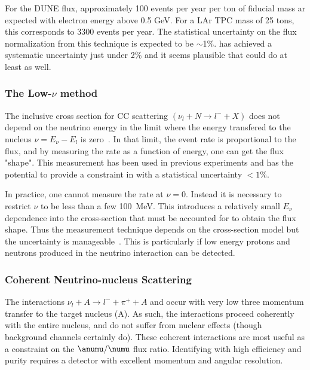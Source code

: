 For the DUNE flux, approximately 100 events per year per ton of fiducial mass ar expected with electron energy above 0.5 GeV. For a LAr TPC mass of 25 tons, this corresponds to 3300 events per year. The statistical uncertainty on the flux normalization from this technique is expected to be $\sim$1\%. \minerva has achieved a systematic uncertainty just under 2\% and it seems plausible that \dune could do at least as well\cite{bib:minervanue}. 


\subsubsection{The Low-$\nu$ method}
The inclusive cross section for CC scattering $(\nu_l+N\rightarrow l^-+X)$ does not depend on the neutrino energy in the limit where the energy transfered to the nucleus $\nu = E_\nu-E_{l} $ is zero~\cite{bib:original_lownu}.  In that limit, the event rate is proportional to the flux, and by measuring the rate as a function of energy, one can get the flux "shape". This measurement has been used in previous experiments and has the potential to provide a constraint in \dune with a statistical uncertainty $<1\%$.

In practice, one cannot measure the rate at $\nu=0$. Instead it is necessary to restrict $\nu$ to be less than a few \SI{100}{MeV}.  This introduces a relatively small $E_\nu$ dependence into the cross-section that must be accounted for to obtain the flux shape. Thus the  measurement technique depends on the cross-section model but the uncertainty is manageable~\cite{bib:bodek_lownu}. This is particularly if low energy protons and neutrons produced in the neutrino interaction can be detected. 

\subsubsection{Coherent Neutrino-nucleus Scattering}
The interactions $\nu_l + A \rightarrow l^- + \pi^+ + A$ and 
occur with very low three momentum transfer to the target nucleus (A). As such, the interactions proceed coherently with the entire nucleus, and do not suffer from nuclear effects (though background channels certainly do). These coherent interactions are most useful as a constraint on the $\anumu/\numu$ flux ratio. Identifying with high efficiency and purity requires a detector with excellent momentum and angular resolution.

